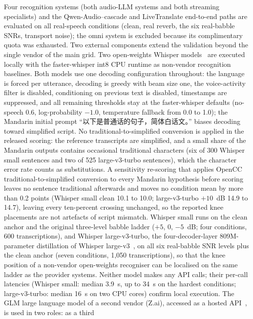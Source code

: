 Four recognition systems (both audio-LLM systems and both streaming
specialists) and the Qwen-Audio--cascade and LiveTranslate end-to-end
paths are evaluated on all real-speech conditions (clean, real reverb, the
six real-babble SNRs, transport noise); the omni system is excluded because
its complimentary quota was exhausted. Two external components extend the
validation beyond the single vendor of the main grid. Two open-weights Whisper
models~\citep{radford2023robust} are executed locally with the
faster-whisper int8 CPU runtime as non-vendor recognition baselines. Both
models use one decoding configuration throughout: the language is forced per
utterance, decoding is greedy with beam size one, the voice-activity filter
is disabled, conditioning on previous text is disabled, timestamps are
suppressed, and all remaining thresholds stay at the faster-whisper defaults
(no-speech 0.6, log-probability $-1.0$, temperature fallback from 0.0 to
1.0); the Mandarin initial prompt
``以下是普通话的句子，简体白话文。''
biases decoding toward simplified script. No traditional-to-simplified
conversion is applied in the released scoring: the reference transcripts are
simplified, and a small share of the Mandarin outputs contains occasional
traditional characters (six of 300 Whisper small sentences and two of 525
large-v3-turbo sentences), which the character error rate counts as
substitutions. A sensitivity re-scoring that applies OpenCC
traditional-to-simplified conversion to every Mandarin hypothesis before
scoring leaves no sentence traditional afterwards and moves no condition
mean by more than 0.2 points (Whisper small clean 10.1 to 10.0;
large-v3-turbo $+10$~dB 14.9 to 14.7), leaving every ten-percent crossing
unchanged, so the reported knee placements are not artefacts of script
mismatch. Whisper
small runs on the clean anchor and the original three-level babble ladder
($+5$, $0$, $-5$~dB; four conditions, 600
transcriptions), and Whisper large-v3-turbo, the four-decoder-layer
809M-parameter distillation of Whisper large-v3~\citep{whisperturbo2024},
on all six real-babble SNR levels plus the clean anchor (seven conditions,
1{,}050 transcriptions), so that the knee position of a non-vendor
open-weights recogniser can be localised on the same ladder as the provider
systems. Neither model makes any API calls; their per-call latencies
(Whisper small: median 3.9~s, up to 34~s on the hardest conditions;
large-v3-turbo: median 16~s on two CPU cores) confirm local execution. The GLM large language
model of a second vendor (Z.ai), accessed as a hosted
API~\citep{glm2026api,glm2025tech}, is used in two roles: as a third
